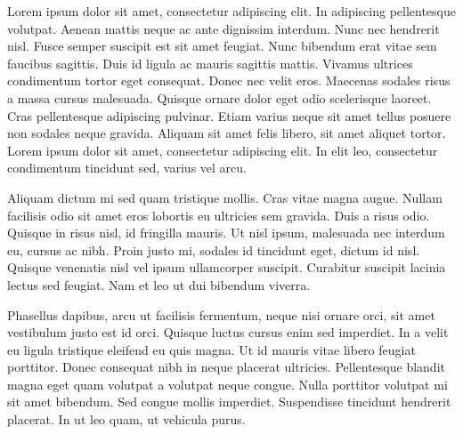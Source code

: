Lorem ipsum dolor sit amet, consectetur adipiscing elit. In adipiscing pellentesque volutpat. Aenean mattis neque ac ante dignissim interdum. Nunc nec hendrerit nisl. Fusce semper suscipit est sit amet feugiat. Nunc bibendum erat vitae sem faucibus sagittis. Duis id ligula ac mauris sagittis mattis. Vivamus ultrices condimentum tortor eget consequat. Donec nec velit eros. Maecenas sodales risus a massa cursus malesuada. Quisque ornare dolor eget odio scelerisque laoreet. Cras pellentesque adipiscing pulvinar. Etiam varius neque sit amet tellus posuere non sodales neque gravida. Aliquam sit amet felis libero, sit amet aliquet tortor. Lorem ipsum dolor sit amet, consectetur adipiscing elit. In elit leo, consectetur condimentum tincidunt sed, varius vel arcu.

Aliquam dictum mi sed quam tristique mollis. Cras vitae magna augue. Nullam facilisis odio sit amet eros lobortis eu ultricies sem gravida. Duis a risus odio. Quisque in risus nisl, id fringilla mauris. Ut nisl ipsum, malesuada nec interdum eu, cursus ac nibh. Proin justo mi, sodales id tincidunt eget, dictum id nisl. Quisque venenatis nisl vel ipsum ullamcorper suscipit. Curabitur suscipit lacinia lectus sed feugiat. Nam et leo ut dui bibendum viverra.

Phasellus dapibus, arcu ut facilisis fermentum, neque nisi ornare orci, sit amet vestibulum justo est id orci. Quisque luctus cursus enim sed imperdiet. In a velit eu ligula tristique eleifend eu quis magna. Ut id mauris vitae libero feugiat porttitor. Donec consequat nibh in neque placerat ultricies. Pellentesque blandit magna eget quam volutpat a volutpat neque congue. Nulla porttitor volutpat mi sit amet bibendum. Sed congue mollis imperdiet. Suspendisse tincidunt hendrerit placerat. In ut leo quam, ut vehicula purus.